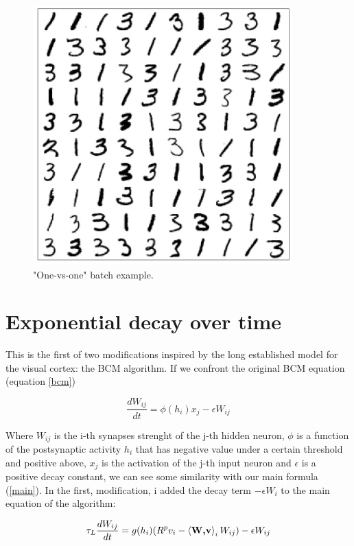 \documentclass[a4paper]{report}
\begin{document}
\begin{figure} [H]
    \centering
    \includegraphics [width=10cm ] {o/31.png}
    \caption{"One-vs-one" batch example.}
    \label{1v1}
\end{figure}

\section{Exponential decay over time}

This is the first of two modifications inspired by the long established model for the visual cortex: the BCM algorithm. If we confront the original BCM equation (equation \ref{bcm})

\begin{equation}
    \frac{dW_{ij}}{dt} = \phi(h_i)x_{j} - \epsilon W_{ij}
    \label{bcm}
\end{equation}

Where $W_{ij}$ is the i-th synapses strenght of the j-th hidden neuron, $\phi$ is a function of the postsynaptic activity $h_i$ that has negative value under a certain threshold and positive above, $x_{j}$ is the activation of the j-th input neuron and $\epsilon$ is a positive decay constant, we can see some similarity with our main formula (\ref{main}).
In the first, modification, i added the decay term $-\epsilon W_i$ to the main equation of the algorithm:

\begin{equation}\label{099}
    \tau_L \frac{dW_{ij}}{dt} = g(h_i)(R^p v_i - \braket{\textbf{W,v}}_i W_{ij} ) -\epsilon W_{ij}
\end{equation}
\end{document}
